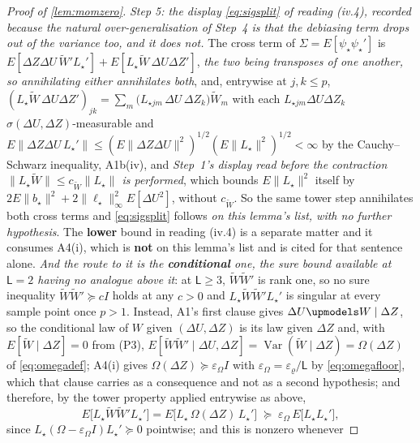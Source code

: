 \begin{proof}[Proof of \cref{lem:momzero}]
\emph{Step 5: the display \eqref{eq:sigsplit} of reading \textup{(iv.4)}, recorded because the natural
over-generalisation of Step~4 is that the debiasing term drops out of the variance too, and it does
not.} The cross term of $\Sigma=E[\psi_\star\psi_\star']$ is
$E[\Delta Z\Delta U\,\widetilde W'L_\star']+E[L_\star\widetilde W\,\Delta U\Delta Z']$, \emph{the two
being transposes of one another, so annihilating either annihilates both}, and, entrywise at
$j,k\le p$, $(L_\star\widetilde W\,\Delta U\Delta Z')_{jk}
=\sum_{m}\big(L_{\star jm}\,\Delta U\,\Delta Z_k\big)\widetilde W_m$ with each
$L_{\star jm}\Delta U\Delta Z_k$ $\sigma(\Delta U,\Delta Z)$-measurable and
$E\|\Delta Z\Delta U\,L_\star'\|\le(E\|\Delta Z\Delta U\|^{2})^{1/2}(E\|L_\star\|^{2})^{1/2}<\infty$ by the
Cauchy--Schwarz inequality, A1b(iv), and \emph{Step~1's display read before the contraction
$\|L_\star\widetilde W\|\le c_{\widetilde W}\|L_\star\|$ is performed}, which bounds $E\|L_\star\|^{2}$ itself by
$2E\|b_\star\|^{2}+2\|\ell_\star\|_\infty^{2}E[\Delta U^{2}]$, without $c_{\widetilde W}$. So the same
tower step annihilates both cross terms and
\eqref{eq:sigsplit} follows \emph{on this lemma's list, with no further hypothesis}. The
\textbf{lower} bound in reading \textup{(iv.4)} is a separate matter and it consumes A4(i), which is
\textbf{not} on this lemma's list and is cited for that sentence alone. \emph{And the route to it is the
\textbf{conditional} one, the sure bound available at $\mathsf L=2$ having no analogue above it}: at
$\mathsf L\ge3$, $\widetilde W\widetilde W'$ is rank one, so no sure inequality
$\widetilde W\widetilde W'\succeq cI$ holds at any $c>0$ and $L_\star\widetilde W\widetilde W'L_\star'$ is
singular at every sample point once $p>1$. Instead, A1's first clause gives
$\Delta U\upmodels W\mid\Delta Z$, so the conditional law of $W$ given $(\Delta U,\Delta Z)$ is its law
given $\Delta Z$ and, with $E[\widetilde W\mid\Delta Z]=0$ from (P3),
$E[\widetilde W\widetilde W'\mid\Delta U,\Delta Z]=\operatorname{Var}(\widetilde W\mid\Delta Z)=\Omega(\Delta Z)$
of \eqref{eq:omegadef}; A4(i) gives $\Omega(\Delta Z)\succeq\varepsilon_\Omega I$ with
$\varepsilon_\Omega=\varepsilon_\varrho/\mathsf L$ by \eqref{eq:omegafloor}, which that clause carries as a
consequence and not as a second hypothesis; and therefore, by the tower property applied entrywise as
above,
\[
E\big[L_\star\widetilde W\widetilde W'L_\star'\big]
=E\big[L_\star\,\Omega(\Delta Z)\,L_\star'\big]\;\succeq\;\varepsilon_\Omega\,E\big[L_\star L_\star'\big] ,
\]
since $L_\star(\Omega-\varepsilon_\Omega I)L_\star'\succeq0$ pointwise; and this is nonzero whenever

\end{proof}
